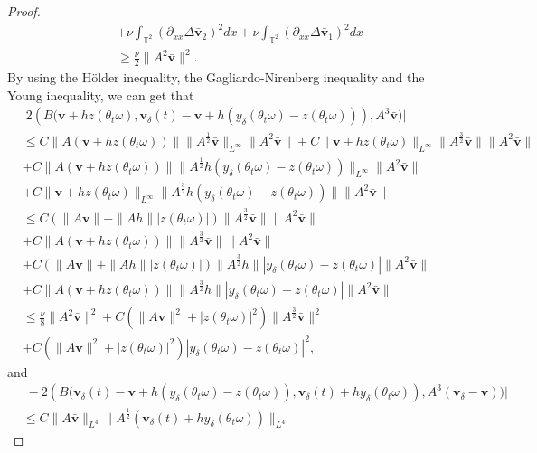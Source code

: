 \documentclass{elsarticle}
\theoremstyle{definition}
\numberwithin{equation}{section}
\begin{document}
\begin{proof}
\begin{align}
&+\nu \int_{\mathbb{T}^2}(\partial_{xx}\Delta \bar{\textbf{v}}_2)^2dx+\nu \int_{\mathbb{T}^2}(\partial_{xx}\Delta \bar{\textbf{v}}_1)^2dx
\nonumber\\
&\geq\frac\nu2\|A^2 \bar{\textbf{v}}\|^2.
\end{align}
By using the H\"{o}lder inequality, the Gagliardo-Nirenberg inequality and the Young inequality, we can get that
\begin{align}\label{9.12}
 &\big| 2(B\big(\textbf{v}+hz(\theta_t\omega),\textbf{v}_\delta(t)-\textbf{v}+h(y_\delta(\theta_t\omega)-z(\theta_t\omega)))
,A^3\bar{\textbf{v}}\big)\big|\nonumber\\
 &\leq C\|A(\textbf{v}+hz(\theta_t\omega))\|\|A^\frac12\bar{\textbf{v}}\|_{L^\infty}\|A^2\bar{\textbf{v}}\|
 +C\|\textbf{v}+hz(\theta_t\omega)\|_{L^\infty}\|A^\frac32\bar{\textbf{v}}\|\|A^2\bar{\textbf{v}}\|\nonumber\\
 &+C\|A(\textbf{v}+hz(\theta_t\omega))\|\|A^\frac12h(y_\delta(\theta_t\omega)-z(\theta_t\omega))
 \|_{L^\infty}\|A^2\bar{\textbf{v}}\|\nonumber\\
 &+C\|\textbf{v}+hz(\theta_t\omega)\|_{L^\infty}\|A^\frac32h(y_\delta(\theta_t\omega)-z(\theta_t\omega))\|\|A^2\bar{\textbf{v}}\|
 \nonumber\\
 &\leq C(\|A\textbf{v}\|+\|Ah\||z(\theta_t\omega)|)\|A^\frac32\bar{\textbf{v}}\|\|A^2\bar{\textbf{v}}\|\nonumber\\
 &+C\|A(\textbf{v}+hz(\theta_t\omega))\|\|A^\frac32\bar{\textbf{v}}\|\|A^2\bar{\textbf{v}}\|\nonumber\\
 &+C(\|A\textbf{v}\|+\|Ah\||z(\theta_t\omega)|)\|A^\frac32h\||y_\delta(\theta_t\omega)-z(\theta_t\omega)|
 \|A^2\bar{\textbf{v}}\|\nonumber\\
 &+C\|A(\textbf{v}+hz(\theta_t\omega))\|\|A^\frac32h\||y_\delta(\theta_t\omega)-z(\theta_t\omega)|
 \|A^2\bar{\textbf{v}}\|\nonumber\\
 &\leq \frac{\nu}{8}\|A^2\bar{\textbf{v}}\|^2+C(\|A\textbf{v}\|^2+|z(\theta_t\omega)|^2)\|A^\frac32\bar{\textbf{v}}\|^2\nonumber\\
 &+C(\|A\textbf{v}\|^2+|z(\theta_t\omega)|^2)|y_\delta(\theta_t\omega)-z(\theta_t\omega)|^2,
\end{align}
and 
\begin{align}\label{9.13}
&\big| -2(B\big( \textbf{v}_\delta(t)-\textbf{v}+h(y_\delta(\theta_t\omega)-z(\theta_t\omega)),\textbf{v}_\delta(t)+hy_\delta(\theta_t\omega))
,A^3(\textbf{v}_\delta-\textbf{v})\big)\big|\nonumber\\
&\leq C\|A\bar{\textbf{v}}\|_{L^4}\|A^\frac12(\textbf{v}_\delta(t)+hy_\delta(\theta_t\omega))\|_{L^4}

\end{align}
\end{proof}
\end{document}
